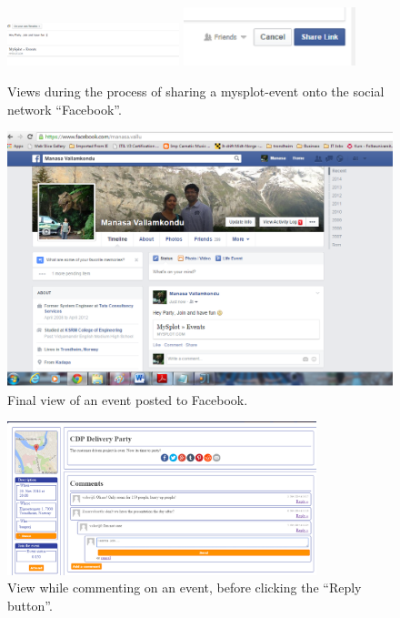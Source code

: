 \begin{figure}[ht!]
  \centering
  \includegraphics[width=50mm]{Sprint5/img/test2.png}
  \includegraphics[width=50mm]{Sprint5/img/test3.png}
  \caption{Views during the process of sharing a mysplot-event onto the social network ``Facebook''. }
  \label{fig:S5TestSharingFacebook}
\end{figure}

\begin{figure}[ht!]
  \centering
  \includegraphics[width=\linewidth]{Sprint5/img/test4.png}
  \caption{Final view of an event posted to Facebook.}
  \label{fig:S5TestFacebookView}
\end{figure}

\begin{figure}[ht!]
  \centering
  \includegraphics[width=90mm]{Sprint5/img/test5.png}
  \caption{View while commenting on an event, before clicking the ``Reply button''. }
  \label{fig:S5TestBeforeComment}
\end{figure}

